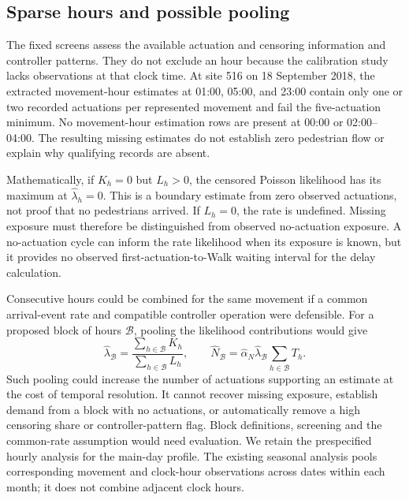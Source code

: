 \documentclass[11pt]{article}
\begin{document}
\subsection*{Sparse hours and possible pooling}

The fixed screens assess the available actuation and censoring information and controller patterns. They do not exclude an hour because the calibration study lacks observations at that clock time. At site 516 on 18 September 2018, the extracted movement-hour estimates at 01:00, 05:00, and 23:00 contain only one or two recorded actuations per represented movement and fail the five-actuation minimum. No movement-hour estimation rows are present at 00:00 or 02:00--04:00. The resulting missing estimates do not establish zero pedestrian flow or explain why qualifying records are absent.

Mathematically, if $K_h=0$ but $L_h>0$, the censored Poisson likelihood has its maximum at $\widehat\lambda_h=0$. This is a boundary estimate from zero observed actuations, not proof that no pedestrians arrived. If $L_h=0$, the rate is undefined. Missing exposure must therefore be distinguished from observed no-actuation exposure. A no-actuation cycle can inform the rate likelihood when its exposure is known, but it provides no observed first-actuation-to-Walk waiting interval for the delay calculation.

Consecutive hours could be combined for the same movement if a common arrival-event rate and compatible controller operation were defensible. For a proposed block of hours $\mathcal B$, pooling the likelihood contributions would give
\begin{equation}
\widehat\lambda_{\mathcal B}
=\frac{\sum_{h\in\mathcal B}K_h}{\sum_{h\in\mathcal B}L_h},\qquad
\widehat N_{\mathcal B}
=\widehat\alpha_N\widehat\lambda_{\mathcal B}
\sum_{h\in\mathcal B}T_h.
\end{equation}
Such pooling could increase the number of actuations supporting an estimate at the cost of temporal resolution. It cannot recover missing exposure, establish demand from a block with no actuations, or automatically remove a high censoring share or controller-pattern flag. Block definitions, screening and the common-rate assumption would need evaluation. We retain the prespecified hourly analysis for the main-day profile. The existing seasonal analysis pools corresponding movement and clock-hour observations across dates within each month; it does not combine adjacent clock hours.
\end{document}
